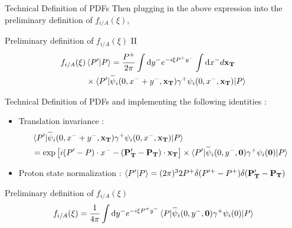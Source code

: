 \documentclass[aspectratio=169,xcolor=dvipsnames]{beamer}
\newcommand{\overbar}[1]{
	\mkern 1.5mu \overline{\mkern-1.5mu\raisebox{0pt}[\dimexpr\height+0.5mm\relax]{$#1$}\mkern-1.5mu}\mkern 1.5mu
}
\newcommand*\dif{\mathop{}\!\mathrm{d}}
\begin{document}
\begin{frame}{Technical Definition of PDFs}
	Then plugging in the above expression into the preliminary definition of $f_{i/A}(\xi)$, \vskip0.15in
	\begin{block}{Preliminary definition of $f_{i/A}(\xi)$ II}
		\begin{align*}
		f_{i/A}(\xi)&\braket{P'|P}=\frac{P^+}{2\pi}\int \dif y^- e^{-i\xi P^+ y^-} \int \dif x^- d\mathbf{x_T} \\
		&\times \braket{P'|\overbar{\psi}_i(0,x^-+y^-,\mathbf{x_T})\gamma^+\psi_i(0,x^-,\mathbf{x_T})|P}\\
		\end{align*}
	\end{block}
	
\end{frame}

\begin{frame}{Technical Definition of PDFs}
		and implementing the following identities : \vskip0.05in
	\begin{itemize}
		\item Translation invariance : 
		\begin{align*}
			&\braket{P'|\overbar{\psi}_i(0,x^-+y^-,\mathbf{x_T})\gamma^+\psi_i(0,x^-,\mathbf{x_T})|P} \\
			&=\exp\left[i(P'-P)\cdot x^--(\mathbf{P'_T}-\mathbf{P_T})\cdot \mathbf{x_T} \right] \times \braket{P'|\overbar{\psi}_i(0,y^-,\mathbf{0})\gamma^+ \psi_i(\mathbf{0})|P}
		\end{align*} 
		\item Proton state normalization : $\braket{P'|P}=(2\pi)^3 2P^+ \delta(P'^+ - P^+) \delta(\mathbf{P'_T}-\mathbf{P_T})$
	\end{itemize}

	\begin{block}{Preliminary definition of $f_{i/A}(\xi)$}
		\begin{align*}
			f_{i/A}(\xi) = \frac{1}{4\pi} \int \dif y^- e^{-i\xi P^+ y^-} \braket{P|\overbar{\psi}_i(0,y^-,\mathbf{0})\gamma^+\psi_i(0)|P}\\
		\end{align*}
	\end{block}
\end{frame}
\end{document}
